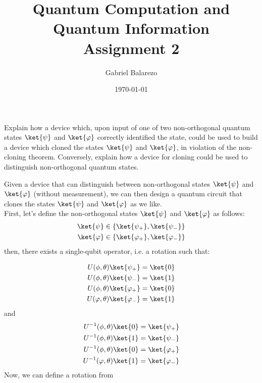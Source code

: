 \documentclass[12 pt]{article}
\title{Quantum Computation and Quantum Information\\
Assignment 2}
\author{Gabriel Balarezo}
\date{\today}
\begin{document}
\maketitle

\begin{mdframed}[backgroundcolor = gray!30,
  frametitle = Exercise 1.2]
  Explain how a device which, upon input of one of two non-orthogonal quantum states $\ket{\psi}$ and $\ket{\varphi}$ correctly identified the state, could be used to build a device which cloned the states $\ket{\psi}$ and $\ket{\varphi}$, in violation of the non-cloning theorem. Conversely, explain how a device for cloning could be used to distinguish non-orthogonal quantum states.
\end{mdframed}

Given a device that can distinguish between non-orthogonal states $\ket{\psi}$ and $\ket{\varphi}$ (without measurement), we can then design a quantum circuit
that clones the states $\ket{\psi}$ and $\ket{\varphi}$ as we like.\\ 
First, let's define the non-orthogonal states $\ket{\psi}$ and $\ket{\varphi}$ as follows:
\begin{align}
  \ket{\psi} & \in \{\ket{\psi_+}, \ket{\psi_-}\} \\
  \ket{\varphi} & \in \{\ket{\varphi_+}, \ket{\varphi_-}\}
\end{align}
then, there exists a single-qubit operator, i.e. a rotation such that:

\begin{align*}
  U(\phi, \theta) \ket{\psi_+} = \ket{0} \\
  U(\phi, \theta)\ket{\psi_-} = \ket{1} \\
  U(\phi, \theta)\ket{\varphi_+} = \ket{0} \\
  U(\varphi, \theta)\ket{\varphi_-} = \ket{1}
\end{align*}
and 
\begin{align*}
  U^{-1}(\phi, \theta) \ket{0} = \ket{\psi_+} \\
  U^{-1}(\phi, \theta)\ket{1} = \ket{\psi_-} \\
  U^{-1}(\phi, \theta)\ket{0} = \ket{\varphi_+} \\
  U^{-1}(\varphi, \theta)\ket{1} = \ket{\varphi_-}
\end{align*}
Now, we can define a rotation from
\end{document}
